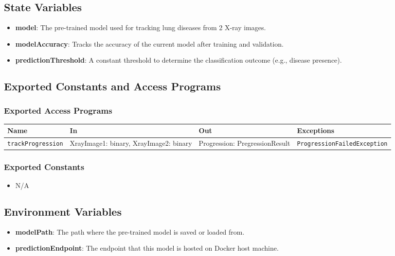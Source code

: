 \documentclass[12pt, titlepage]{article}
\begin{document}
\subsection{State Variables}
\begin{itemize}
    \item \textbf{model}: The pre-trained model used for tracking lung diseases from 2 X-ray images.
    \item \textbf{modelAccuracy}: Tracks the accuracy of the current model after training and validation.
    \item \textbf{predictionThreshold}: A constant threshold to determine the classification outcome (e.g., disease presence).
\end{itemize}

\subsection{Exported Constants and Access Programs}
\subsubsection{Exported Access Programs}
\begin{center}
\small
\renewcommand{\arraystretch}{1.5}
\begin{tabular}{|p{3.5cm}|p{3.5cm}|p{3cm}|l|}
    \hline
    \textbf{Name} & \textbf{In} & \textbf{Out} & \textbf{Exceptions} \\
    \hline 
    \texttt{trackProgression} & XrayImage1: binary, \newline XrayImage2: binary & Progression: PregressionResult & \texttt{ProgressionFailedException} \\
    \hline
\end{tabular}
\end{center}

\subsubsection{Exported Constants}
\begin{itemize}
    \item N/A
\end{itemize}

\subsection{Environment Variables}
\begin{itemize}
    \item \textbf{modelPath}: The path where the pre-trained model is saved or loaded from.
    \item \textbf{predictionEndpoint}: The endpoint that this model is hosted on Docker host machine.
\end{itemize}
\end{document}
